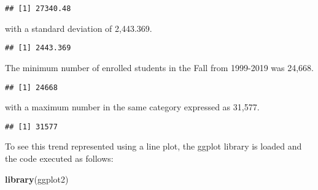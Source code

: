 \documentclass[
]{article}
\newenvironment{Shaded}{\begin{snugshade}}{\end{snugshade}}
\newcommand{\DataTypeTok}[1]{\textcolor[rgb]{0.13,0.29,0.53}{#1}}
\newcommand{\KeywordTok}[1]{\textcolor[rgb]{0.13,0.29,0.53}{\textbf{#1}}}
\newcommand{\NormalTok}[1]{#1}
\newcommand{\OperatorTok}[1]{\textcolor[rgb]{0.81,0.36,0.00}{\textbf{#1}}}
\newcommand{\OtherTok}[1]{\textcolor[rgb]{0.56,0.35,0.01}{#1}}
\begin{document}
\begin{verbatim}
## [1] 27340.48
\end{verbatim}

with a standard deviation of 2,443.369.

\begin{Shaded}
\end{Shaded}

\begin{verbatim}
## [1] 2443.369
\end{verbatim}

The minimum number of enrolled students in the Fall from 1999-2019 was
24,668.

\begin{Shaded}
\end{Shaded}

\begin{verbatim}
## [1] 24668
\end{verbatim}

with a maximum number in the same category expressed as 31,577.

\begin{Shaded}
\end{Shaded}

\begin{verbatim}
## [1] 31577
\end{verbatim}

To see this trend represented using a line plot, the ggplot library is
loaded and the code executed as follows:

\begin{Shaded}
\begin{Highlighting}[]
\KeywordTok{library}\NormalTok{(ggplot2)}
\end{Highlighting}
\end{Shaded}
\end{document}

